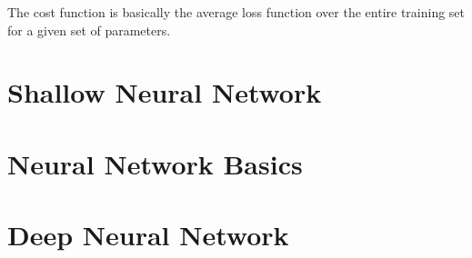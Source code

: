 The cost function is basically the average loss function over the entire training set for a given set of parameters.


\section{Shallow Neural Network}

\section{Neural Network Basics}





\section{Deep Neural Network}

